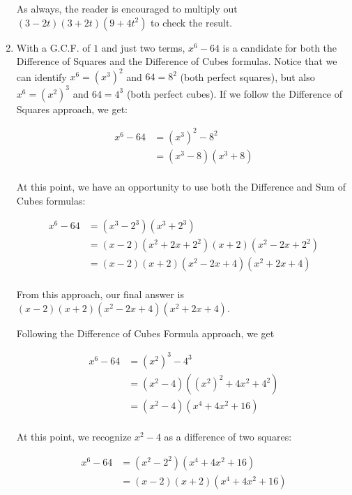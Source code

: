 \begin{ex}
\begin{enumerate}
As always, the reader is encouraged to multiply out $(3 - 2t)(3+2t)(9 + 4t^2)$ to check the result.

\item  With a G.C.F. of $1$ and just two terms, $x^6 - 64$ is a candidate for both the Difference of Squares and the Difference of Cubes formulas.  Notice that we can identify $x^6 = (x^3)^2$ and $64 = 8^2$ (both perfect squares), but also $x^6 = (x^2)^3$ and $64 = 4^3$ (both perfect cubes).  If we follow the Difference of Squares approach, we get:

\begin{align*}
x^6 - 64 & = (x^3)^2 - 8^2 \\
& = (x^3 - 8)(x^3 + 8) \tag{Difference of Squares, $a = x^3$ and $b = 8$} \\
\end{align*}

At this point, we have an opportunity to use both the Difference and Sum of Cubes formulas: 

\begin{align*}
x^6 - 64 & = (x^3 - 2^3)(x^3 + 2^3) \\
& = (x-2)(x^2+2x+2^2)(x+2)(x^2 - 2x + 2^2) \tag{Sum / Difference of Cubes, $a = x$, $b = 2$} \\ 
& = (x-2)(x+2)(x^2-2x+4)(x^2+2x+4) \tag{Rearrange factors} \\ 
\end{align*}

From this approach, our final answer is $(x-2)(x+2)(x^2-2x+4)(x^2+2x+4)$.  

Following the Difference of Cubes Formula approach, we get

\begin{align*}
x^6 - 64 & = (x^2)^3 - 4^3 \\
& = (x^2 - 4)((x^2)^2 + 4x^2 + 4^2) \tag{Difference of Cubes, $a = x^2$, $b = 4$} \\ 
& = (x^2 - 4)(x^4 + 4x^2 + 16) \\ 
\end{align*}

At this point, we recognize $x^2 - 4$ as a difference of two squares:

\begin{align*}
x^6 - 64 & = (x^2 - 2^2)(x^4 + 4x^2 + 16)  \\
& = (x-2)(x+2)(x^4 + 4x^2 + 16) \tag{Difference of Squares, $a = x$, $b = 2$} \\ 
\end{align*}


\end{enumerate}
\end{ex}
